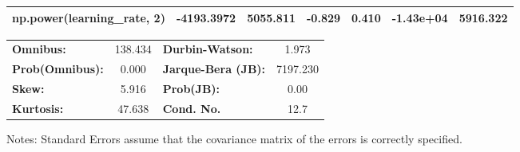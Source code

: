 \begin{center}
\begin{tabular}{lcccccc}
\textbf{np.power(learning\_rate, 2)}      &   -4193.3972  &     5055.811     &    -0.829  &         0.410        &    -1.43e+04    &     5916.322     \\
\bottomrule
\end{tabular}
\begin{tabular}{lclc}
\textbf{Omnibus:}       & 138.434 & \textbf{  Durbin-Watson:     } &    1.973  \\
\textbf{Prob(Omnibus):} &   0.000 & \textbf{  Jarque-Bera (JB):  } & 7197.230  \\
\textbf{Skew:}          &   5.916 & \textbf{  Prob(JB):          } &     0.00  \\
\textbf{Kurtosis:}      &  47.638 & \textbf{  Cond. No.          } &     12.7  \\
\bottomrule
\end{tabular}
\end{center}

Notes: \newline
 [1] Standard Errors assume that the covariance matrix of the errors is correctly specified.